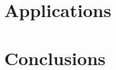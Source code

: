 \documentclass[11pt,openright,oneside,letterpaper,onecolumn]{report}  %
\begin{document}
\part{Applications}




\part{Conclusions}


% 
% 

\singlespacing
 

\end{document}
